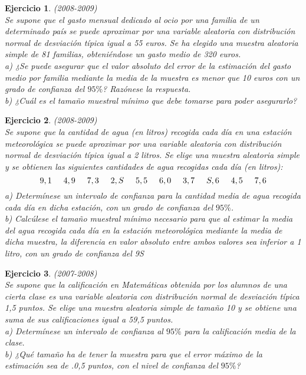 \documentclass[12pt, a4paper]{amsart}
\newtheorem{ejer}{Ejercicio}
\begin{document}
\begin{ejer}\em (2008-2009)\\
Se supone que el gasto mensual dedicado al ocio por una familia de un determinado país se
puede aproximar por una variable aleatoria con distribución normal de desviación típica igual
a 55 euros. Se ha elegido una muestra aleatoria simple de 81 familias, obteniéndose un gasto
medio de 320 euros.\\
a) ¿Se puede asegurar que el valor absoluto del error de la estimación del gasto medio por familia
mediante la media de la muestra es menor que 10 euros con un grado de confianza del $95\%$?
Razónese la respuesta.\\
b) ¿Cuál es el tamaño muestral mínimo que debe tomarse para poder asegurarlo?
\end{ejer}

\begin{ejer}\em (2008-2009)\\
Se supone que la cantidad de agua (en litros) recogida cada día en una estación meteorológica
se puede aproximar por una variable aleatoria con distribución normal de desviación típica igual
a 2 litros. Se elige una muestra aleatoria simple y se obtienen las siguientes cantidades de agua
recogidas cada día (en litros):
\[9,1\hspace*{5mm} 4,9\hspace*{5mm} 7,3\hspace*{5mm} 2,S\hspace*{5mm} 5,5\hspace*{5mm} 6,0\hspace*{5mm} 3,7\hspace*{5mm} S,6\hspace*{5mm} 4,5\hspace*{5mm} 7,6\]
a) Determínese un intervalo de confianza para la cantidad media de agua recogida cada día en
dicha estación, con un grado de confianza del $95\%$.\\
b) Calcúlese el tamaño muestral mínimo necesario para que al estimar la media del agua recogida
cada día en la estación meteorológica mediante la media de dicha muestra, la diferencia en valor
absoluto entre ambos valores sea inferior a 1 litro, con un grado de confianza del 9S%
\end{ejer}

\begin{ejer}\em (2007-2008)\\
Se supone que la calificación en Matemáticas obtenida por los alumnos de una cierta clase es una
variable aleatoria con distribución normal de desviación típica 1,5 puntos. Se elige una muestra
aleatoria simple de tamaño 10 y se obtiene una suma de sus calificaciones igual a 59,5 puntos.\\
a) Determínese un intervalo de confianza al $95\%$ para la calificación media de la clase.\\
b) ¿Qué tamaño ha de tener la muestra para que el error máximo de la estimación sea de .0,5
puntos, con el nivel de confianza del $95\%$?
\end{ejer}
\end{document}

